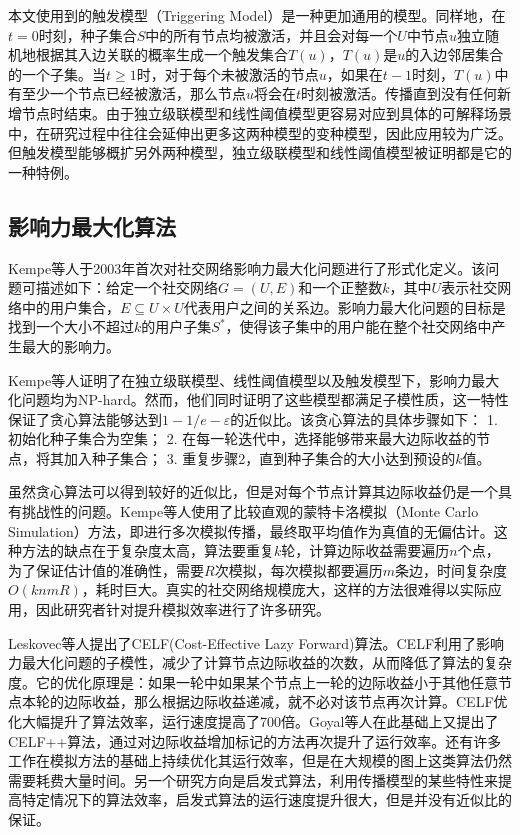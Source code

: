 本文使用到的触发模型（Triggering Model）是一种更加通用的模型。同样地，在$t=0$时刻，种子集合$S$中的所有节点均被激活，并且会对每一个$U$中节点$u$独立随机地根据其入边关联的概率生成一个触发集合$T(u)$，$T(u)$是$u$的入边邻居集合的一个子集。当$t\ge 1$时，对于每个未被激活的节点$u$，如果在$t-1$时刻，$T(u)$中有至少一个节点已经被激活，那么节点$u$将会在$t$时刻被激活。传播直到没有任何新增节点时结束。由于独立级联模型和线性阈值模型更容易对应到具体的可解释场景中，在研究过程中往往会延伸出更多这两种模型的变种模型，因此应用较为广泛。但触发模型能够概扩另外两种模型，独立级联模型和线性阈值模型被证明都是它的一种特例\cite{kempe2003maximizing}。


\subsection{影响力最大化算法}

Kempe等人\cite{kempe2003maximizing}于2003年首次对社交网络影响力最大化问题进行了形式化定义。该问题可描述如下：给定一个社交网络$G=(U,E)$和一个正整数$k$，其中$U$表示社交网络中的用户集合，$E \subseteq U \times U$代表用户之间的关系边。影响力最大化问题的目标是找到一个大小不超过$k$的用户子集$S^*$，使得该子集中的用户能在整个社交网络中产生最大的影响力。

Kempe等人证明了在独立级联模型、线性阈值模型以及触发模型下，影响力最大化问题均为NP-hard。然而，他们同时证明了这些模型都满足子模性质，这一特性保证了贪心算法能够达到$1-1/e-\varepsilon$的近似比。该贪心算法的具体步骤如下：
1. 初始化种子集合为空集；
2. 在每一轮迭代中，选择能够带来最大边际收益的节点，将其加入种子集合；
3. 重复步骤2，直到种子集合的大小达到预设的$k$值。

虽然贪心算法可以得到较好的近似比，但是对每个节点计算其边际收益仍是一个具有挑战性的问题。Kempe等人使用了比较直观的蒙特卡洛模拟（Monte Carlo Simulation）方法，即进行多次模拟传播，最终取平均值作为真值的无偏估计。这种方法的缺点在于复杂度太高，算法要重复$k$轮，计算边际收益需要遍历$n$个点，为了保证估计值的准确性，需要$R$次模拟，每次模拟都要遍历$m$条边，时间复杂度$O(knmR)$，耗时巨大。真实的社交网络规模庞大，这样的方法很难得以实际应用，因此研究者针对提升模拟效率进行了许多研究。

Leskovec等人提出了CELF(Cost-Effective Lazy Forward)算法\cite{leskovec2007cost}。CELF利用了影响力最大化问题的子模性，减少了计算节点边际收益的次数，从而降低了算法的复杂度。它的优化原理是：如果一轮中如果某个节点上一轮的边际收益小于其他任意节点本轮的边际收益，那么根据边际收益递减，就不必对该节点再次计算。CELF优化大幅提升了算法效率，运行速度提高了700倍。Goyal等人\cite{goyal2011celf++}在此基础上又提出了CELF++算法，通过对边际收益增加标记的方法再次提升了运行效率。还有许多工作在模拟方法的基础上持续优化其运行效率\cite{kumar2022csr,王璿2022基于社交网络的影响力最大化算法}，但是在大规模的图上这类算法仍然需要耗费大量时间。另一个研究方向是启发式算法，利用传播模型的某些特性来提高特定情况下的算法效率\cite{kumar2022mder,lozano2024efficient,chen2009efficient,chen2010scalable,chen2010scalable2,goyal2011simpath}，启发式算法的运行速度提升很大，但是并没有近似比的保证。

